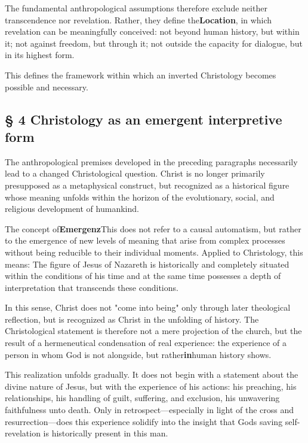 \documentclass[
]{article}
\begin{document}
The fundamental anthropological assumptions therefore exclude neither transcendence nor revelation. Rather, they define the\textbf{Location}, in which revelation can be meaningfully conceived: not beyond human history, but within it; not against freedom, but through it; not outside the capacity for dialogue, but in its highest form.

This defines the framework within which an inverted Christology becomes possible and necessary.

\subsection{\texorpdfstring{\textbf{§ 4 Christology as an emergent interpretive form}}{§ 4 Christology as an emergent interpretive form}}\label{christology-as-an-emergent-interpretive-form}

The anthropological premises developed in the preceding paragraphs necessarily lead to a changed Christological question. Christ is no longer primarily presupposed as a metaphysical construct, but recognized as a historical figure whose meaning unfolds within the horizon of the evolutionary, social, and religious development of humankind.

The concept of\textbf{Emergenz}This does not refer to a causal automatism, but rather to the emergence of new levels of meaning that arise from complex processes without being reducible to their individual moments. Applied to Christology, this means: The figure of Jesus of Nazareth is historically and completely situated within the conditions of his time and at the same time possesses a depth of interpretation that transcends these conditions.

In this sense, Christ does not "come into being" only through later theological reflection, but is recognized as Christ in the unfolding of history. The Christological statement is therefore not a mere projection of the church, but the result of a hermeneutical condensation of real experience: the experience of a person in whom God is not alongside, but rather\textbf{in}human history shows.

This realization unfolds gradually. It does not begin with a statement about the divine nature of Jesus, but with the experience of his actions: his preaching, his relationships, his handling of guilt, suffering, and exclusion, his unwavering faithfulness unto death. Only in retrospect---especially in light of the cross and resurrection---does this experience solidify into the insight that God\textquotesingle s saving self-revelation is historically present in this man.
\end{document}
